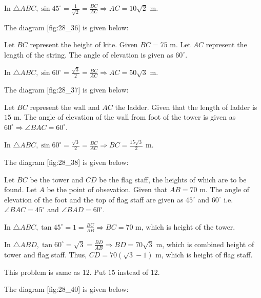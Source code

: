   In $\triangle ABC, \sin45^\circ = \frac{1}{\sqrt{2}} = \frac{BC}{AC} \Rightarrow AC = 10\sqrt{2}$ m.

\item The diagram [fig:28_36] is given below:

  \startplacefigure[reference=fig:28_36]
    \externalfigure[28_36.pdf]
  \stopplacefigure

  Let $BC$ represent the height of kite. Given $BC = 75$ m. Let $AC$ represent the length of the string. The
  angle of elevation is given as $60^\circ$.

  In $\triangle ABC, \sin60^\circ = \frac{\sqrt{3}}{2} = \frac{BC}{AC} \Rightarrow AC = 50\sqrt{3}$ m.

\item The diagram [fig:28_37] is given below:

  \startplacefigure[reference=fig:28_37]
    \externalfigure[28_37.pdf]
  \stopplacefigure

  Let $BC$ represent the wall and $AC$ the ladder. Given that the length of ladder is $15$ m. The angle of
  elevation of the wall from foot of the tower is given as $60^\circ \Rightarrow \angle BAC = 60^\circ$.

  In $\triangle ABC, \sin60^\circ = \frac{\sqrt{3}}{2} = \frac{BC}{AC} \Rightarrow BC = \frac{15\sqrt{3}}{2}$ m.

\item The diagram [fig:28_38] is given below:

  \startplacefigure[reference=fig:28_38]
    \externalfigure[28_38.pdf]
  \stopplacefigure

  Let $BC$ be the tower and $CD$ be the flag staff, the heights of which are to be found. Let $A$ be the point
  of obsevation. Given that $AB = 70$ m. The angle of elevation of the foot and the top of flag staff are given as
  $45^\circ$ and $60^\circ$ i.e. $\angle BAC = 45^\circ$ and $\angle BAD = 60^\circ$.

  In $\triangle ABC, \tan45^\circ = 1 = \frac{BC}{AB} \Rightarrow BC = 70$ m, which is height of the tower.

  In $\triangle ABD, \tan60^\circ = \sqrt{3} = \frac{BD}{AB} \Rightarrow BD = 70\sqrt{3}$ m, which is combined height of
  tower and flag staff. Thus, $CD = 70(\sqrt{3} - 1)$ m, which is height of flag staff.

\item This problem is same as 12. Put $15$ instead of $12$.

\item The diagram [fig:28_40] is given below:


